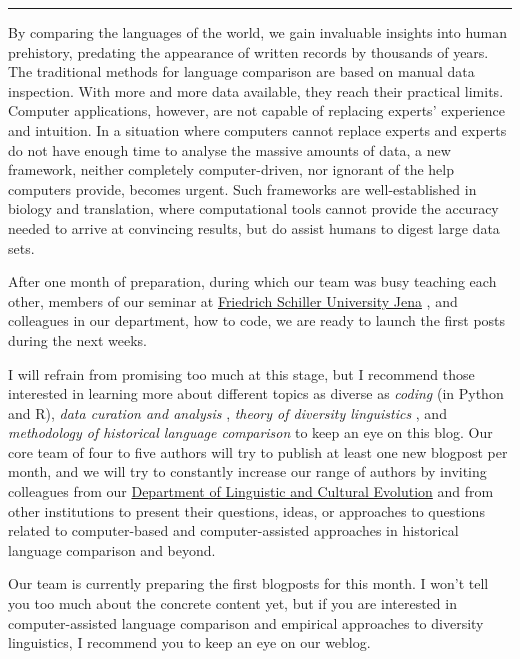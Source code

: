 \documentclass[
  english,
  a4paper,
  oneside,tablecaptionabove
]{scrbook}
\begin{document}
\begin{center}\rule{0.5\linewidth}{\linethickness}\end{center}

By comparing the languages of the world, we gain invaluable insights
into human prehistory, predating the appearance of written records by
thousands of years. The traditional methods for language comparison are
based on manual data inspection. With more and more data available, they
reach their practical limits. Computer applications, however, are not
capable of replacing experts' experience and intuition. In a situation
where computers cannot replace experts and experts do not have enough
time to analyse the massive amounts of data, a new framework, neither
completely computer-driven, nor ignorant of the help computers provide,
becomes urgent. Such frameworks are well-established in biology and
translation, where computational tools cannot provide the accuracy
needed to arrive at convincing results, but do assist humans to digest
large data sets.

After one month of preparation, during which our team was busy teaching
each other, members of our seminar at
\href{http://calc.digling.org/seminar/}{Friedrich Schiller University
Jena} , and colleagues in our department, how to code, we are ready to
launch the first posts during the next weeks.

I will refrain from promising too much at this stage, but I recommend
those interested in learning more about different topics as diverse as
\emph{coding} (in Python and R), \emph{data curation and analysis} ,
\emph{theory of diversity linguistics} , and \emph{methodology of
historical language comparison} to keep an eye on this blog. Our core
team of four to five authors will try to publish at least one new
blogpost per month, and we will try to constantly increase our range of
authors by inviting colleagues from our
\href{http://www.shh.mpg.de/DLCE-Forschungsueberblick}{Department of
Linguistic and Cultural Evolution} and from other institutions to
present their questions, ideas, or approaches to questions related to
computer-based and computer-assisted approaches in historical language
comparison and beyond.

Our team is currently preparing the first blogposts for this month. I
won't tell you too much about the concrete content yet, but if you are
interested in computer-assisted language comparison and empirical
approaches to diversity linguistics, I recommend you to keep an eye on
our weblog.
\end{document}
